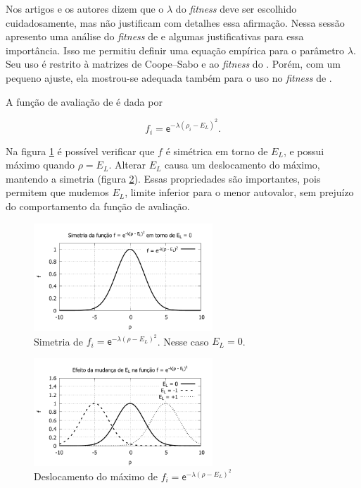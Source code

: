 	Nos artigos \cite{metodo2004} e \cite{metodo2011} os autores dizem que o $\lambda$ do \emph{fitness} deve ser escolhido cuidadosamente, mas não justificam com detalhes essa afirmação. Nessa sessão apresento uma análise do \emph{fitness} de \cite{metodo2011} e algumas justificativas para essa importância. Isso me permitiu definir uma equação empírica para o parâmetro $\lambda$. Seu uso é restrito à matrizes de Coope--Sabo e ao \emph{fitness} do \cite{metodo2011}. Porém, com um pequeno ajuste, ela mostrou-se adequada também para o uso no \emph{fitness} de \cite{metodo2004}.
	
	A função de avaliação de \cite{metodo2011} é dada por
	
	\begin{equation}\label{eq:f_empirica}
		f_i = \mathsf{e}^{- \lambda (\rho_i - 	E_L) ^2}.
	\end{equation}
	
	Na figura \ref{fig:f_simetrico} é possível verificar que $f$ é simétrica em torno de $E_L$, e possui máximo quando $\rho = E_L$. Alterar $E_L$ causa um deslocamento do máximo, mantendo a simetria (figura \ref{fig:f_deslocamento}). Essas propriedades são importantes, pois permitem que mudemos $E_L$, limite inferior para o menor autovalor, sem prejuízo do comportamento da função de avaliação.
	
	\begin{figure}[h]
		\centering
			\includegraphics[width=0.60\textwidth]{figs/resultados/precisaoFitness/f_simetrico.pdf}
		\caption{Simetria de $f_i = \mathsf{e}^{-\lambda(\rho - E_L)^2}$. Nesse caso $E_L = 0$.}
		\label{fig:f_simetrico}
	\end{figure}
	
	\begin{figure}[h]
		\centering
			\includegraphics[width=0.60\textwidth]{figs/resultados/precisaoFitness/f_simetrico_outros.pdf}
		\caption{Deslocamento do máximo de $f_i = \mathsf{e}^{-\lambda(\rho - E_L)^2}$}
		\label{fig:f_deslocamento}
	\end{figure}
	
